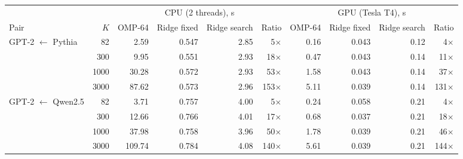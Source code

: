 \begin{tabular}{lrrrrrrrrr}
\toprule
 & & \multicolumn{4}{c}{CPU (2 threads), s} & \multicolumn{4}{c}{GPU (Tesla T4), s} \\
\cmidrule(lr){3-6}\cmidrule(lr){7-10}
Pair & $K$ & OMP-64 & Ridge fixed & Ridge search & Ratio & OMP-64 & Ridge fixed & Ridge search & Ratio \\
\midrule
GPT-2 $\leftarrow$ Pythia & 82 & 2.59 & 0.547 & 2.85 & 5$\times$ & 0.16 & 0.043 & 0.12 & 4$\times$ \\
 & 300 & 9.95 & 0.551 & 2.93 & 18$\times$ & 0.47 & 0.043 & 0.14 & 11$\times$ \\
 & 1000 & 30.28 & 0.572 & 2.93 & 53$\times$ & 1.58 & 0.043 & 0.14 & 37$\times$ \\
 & 3000 & 87.62 & 0.573 & 2.96 & 153$\times$ & 5.11 & 0.039 & 0.14 & 131$\times$ \\
\midrule
GPT-2 $\leftarrow$ Qwen2.5 & 82 & 3.71 & 0.757 & 4.00 & 5$\times$ & 0.24 & 0.058 & 0.21 & 4$\times$ \\
 & 300 & 12.66 & 0.766 & 4.01 & 17$\times$ & 0.68 & 0.037 & 0.21 & 18$\times$ \\
 & 1000 & 37.98 & 0.758 & 3.96 & 50$\times$ & 1.78 & 0.039 & 0.21 & 46$\times$ \\
 & 3000 & 109.74 & 0.784 & 4.08 & 140$\times$ & 5.61 & 0.039 & 0.21 & 144$\times$ \\
\bottomrule
\end{tabular}
